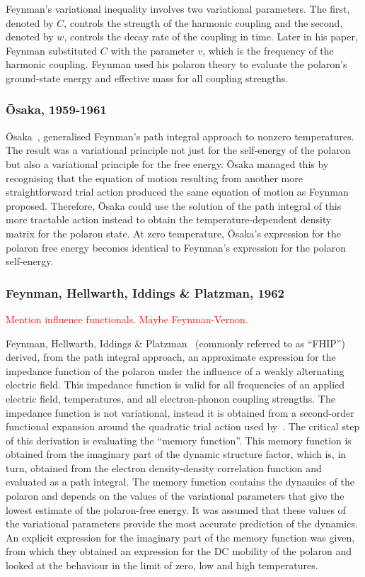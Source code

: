 Feynman's variational inequality involves two variational parameters. The first, denoted by $C$, controls the strength of the harmonic coupling and the second, denoted by $w$, controls the decay rate of the coupling in time. Later in his paper, Feynman substituted $C$ with the parameter $v$, which is the frequency of the harmonic coupling. Feynman used his polaron theory to evaluate the polaron's ground-state energy and effective mass for all coupling strengths.

\subsubsection{\=Osaka, 1959-1961}
\label{subsubsec:2-1-1-4}

\=Osaka~\cite{osaka_polaron_1959, osaka_theory_1961}, generalised Feynman's path integral approach to nonzero temperatures. The result was a variational principle not just for the self-energy of the polaron but also a variational principle for the free energy. \=Osaka managed this by recognising that the equation of motion resulting from another more straightforward trial action produced the same equation of motion as Feynman proposed. Therefore, \=Osaka could use the solution of the path integral of this more tractable action instead to obtain the temperature-dependent density matrix for the polaron state. At zero temperature, Ōsaka's expression for the polaron free energy becomes identical to Feynman's expression for the polaron self-energy.

\subsubsection{Feynman, Hellwarth, Iddings \& Platzman, 1962}
\label{subsubsec:2-1-1-5}

\textcolor{red}{Mention influence functionals. Maybe Feynman-Vernon.}

Feynman, Hellwarth, Iddings \& Platzman~\cite{feynman_mobility_1962} (commonly referred to as ``FHIP'') derived, from the path integral approach, an approximate expression for the impedance function of the polaron under the influence of a weakly alternating electric field. This impedance function is valid for all frequencies of an applied electric field, temperatures, and all electron-phonon coupling strengths. The impedance function is not variational, instead it is obtained from a second-order functional expansion around the quadratic trial action used by~\cite{feynman_slow_1955}. The critical step of this derivation is evaluating the ``memory function''. This memory function is obtained from the imaginary part of the dynamic structure factor, which is, in turn, obtained from the electron density-density correlation function and evaluated as a path integral. The memory function contains the dynamics of the polaron and depends on the values of the variational parameters that give the lowest estimate of the polaron-free energy. It was assumed that these values of the variational parameters provide the most accurate prediction of the dynamics. An explicit expression for the imaginary part of the memory function was given, from which they obtained an expression for the DC mobility of the polaron and looked at the behaviour in the limit of zero, low and high temperatures.

